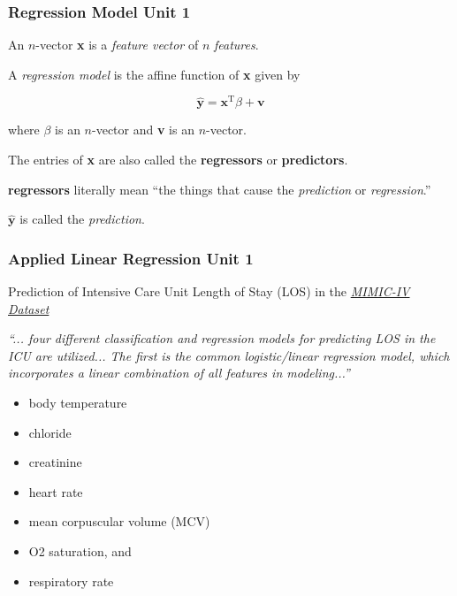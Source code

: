 \documentclass[12pt]{beamer}
\newcommand{\FrameTitle}[2]{\frametitle{#1 \hfill \small\textnormal{\textcolor{midgray}{#2}}}}
\newcommand{\SixPtVspace}{\vspace*{6pt}}
\newcommand{\vsp}{\vspace*{1em}}
\newcommand{\Vector}[1]{\textbf{#1}}
\begin{document}
\begin{frame}\FrameTitle{Regression Model}{Unit 1}
    An $n$-vector \Vector{x} is a \emph{feature vector} of $n$ \emph{features}.\SixPtVspace

    A \emph{regression model} is the affine function of \Vector{x} given by

    \[
        \widehat{\Vector{y}} = \Vector{x}^{\textrm{T}} \beta     + \Vector{v}
    \]

    where $\beta$ is an $n$-vector and \Vector{v} is an $n$-vector.\vsp

    The entries of \Vector{x} are also called the \textbf{regressors} or \textbf{predictors}.\vsp

    \SixPtVspace
        \textbf{regressors} literally mean ``the things that cause the \emph{prediction} or \emph{regression}.''

    \vsp
    $\widehat{\Vector{y}}$ is called the \emph{prediction}.
\end{frame}

\begin{frame}\FrameTitle{Applied Linear Regression}{Unit 1}

Prediction of Intensive Care Unit Length of Stay (LOS)
in the \href{https://www.mdpi.com/2076-3417/13/12/6930}{\emph{MIMIC-IV Dataset}}

\emph{``... four different classification and regression models for predicting LOS in the ICU are
utilized... The first is the common logistic/linear
regression model, which incorporates a linear
combination of all features in modeling...''}

\begin{itemize}
    \item[--] body temperature
    \item[--] chloride
    \item[--] creatinine
    \item[--] heart rate
    \item[--] mean corpuscular volume (MCV)
    \item[--] O2 saturation, and
    \item[--] respiratory rate
\end{itemize}
\end{frame}
\end{document}
